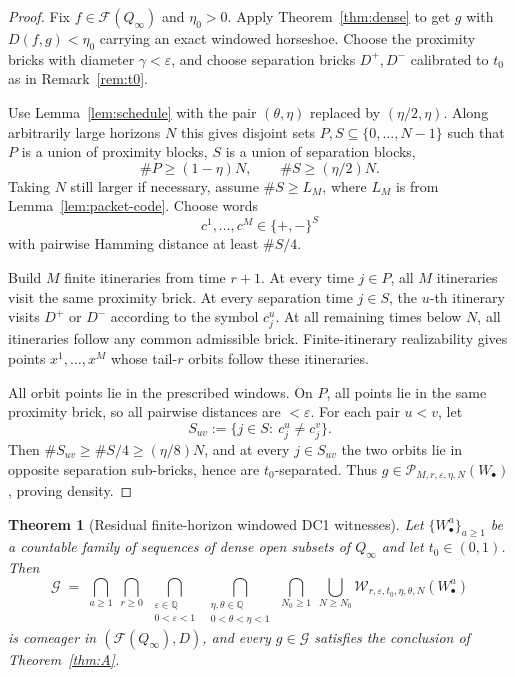 \documentclass[11pt]{article}
\newtheorem{theorem}{Theorem}[section]
\newcommand{\Q}{Q_\infty}
\newcommand{\F}{\mathcal{F}}
\newcommand{\W}{\mathcal{W}}
\newcommand{\Gcal}{\mathcal{G}}
\begin{document}
\begin{proof}
Fix \(f\in\F(\Q)\) and \(\eta_0>0\).  Apply Theorem~\ref{thm:dense} to get
\(g\) with \(D(f,g)<\eta_0\) carrying an exact windowed horseshoe.  Choose the
proximity bricks with diameter \(\gamma<\varepsilon\), and choose separation
bricks \(D^+,D^-\) calibrated to \(t_0\) as in Remark~\ref{rem:t0}.

Use Lemma~\ref{lem:schedule} with the pair \((\theta,\eta)\) replaced by
\((\eta/2,\eta)\).  Along arbitrarily large horizons \(N\) this gives disjoint
sets \(P,S\subseteq\{0,\ldots,N-1\}\) such that \(P\) is a union of proximity
blocks, \(S\) is a union of separation blocks,
\[
  \#P\ge(1-\eta)N,\qquad \#S\ge(\eta/2)N .
\]
Taking \(N\) still larger if necessary, assume \(\#S\ge L_M\), where
\(L_M\) is from Lemma~\ref{lem:packet-code}.  Choose words
\[
  c^1,\ldots,c^M\in\{+,-\}^{S}
\]
with pairwise Hamming distance at least \(\#S/4\).

Build \(M\) finite itineraries from time \(r+1\).  At every time \(j\in P\), all
\(M\) itineraries visit the same proximity brick.  At every separation time
\(j\in S\), the \(u\)-th itinerary visits \(D^+\) or \(D^-\) according to the
symbol \(c^u_j\).  At all remaining times below \(N\), all itineraries follow
any common admissible brick.  Finite-itinerary realizability gives points
\(x^1,\ldots,x^M\) whose tail-\(r\) orbits follow these itineraries.

All orbit points lie in the prescribed windows.  On \(P\), all points lie in
the same proximity brick, so all pairwise distances are \(<\varepsilon\).  For
each pair \(u<v\), let
\[
  S_{uv}:=\{j\in S:\ c^u_j\ne c^v_j\}.
\]
Then \(\#S_{uv}\ge \#S/4\ge(\eta/8)N\), and at every \(j\in S_{uv}\) the two
orbits lie in opposite separation sub-bricks, hence are \(t_0\)-separated.
Thus \(g\in\mathcal P_{M,r,\varepsilon,\eta,N}(W_\bullet)\), proving density.
\end{proof}

\begin{theorem}[Residual finite-horizon windowed DC1 witnesses]\label{thm:residual}
Let $\{W^a_\bullet\}_{a\ge1}$ be a countable family of sequences of dense open subsets of
$\Q$ and let \(t_0\in(0,1)\).  Then
\[
\Gcal\;=\;\bigcap_{a\ge1}\ \bigcap_{r\ge0}\ \bigcap_{\substack{\varepsilon\in\mathbb Q\\0<\varepsilon<1}}\ \bigcap_{\substack{\eta,\theta\in\mathbb Q\\0<\theta<\eta<1}}\ \bigcap_{N_0\ge1}\ \bigcup_{N\ge N_0}\W_{r,\varepsilon,t_0,\eta,\theta,N}(W^a_\bullet)
\]
is comeager in $(\F(\Q),D)$, and every $g\in\Gcal$ satisfies the conclusion of
Theorem~\ref{thm:A}.
\end{theorem}
\end{document}
